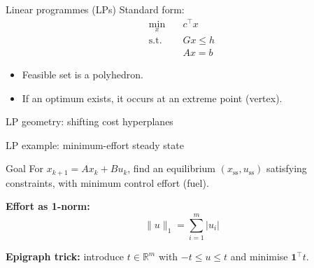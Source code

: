 \documentclass[aspectratio=169,10pt]{beamer}
\newcommand{\R}{\mathbb{R}}
\begin{document}
\begin{frame}{Linear programmes (LPs)}
Standard form:
\begin{equation*}
\begin{aligned}
\min_x\quad & c^\top x\\
\text{s.t.}\quad &Gx\le h\\
&Ax=b
\end{aligned}
\end{equation*}

\begin{itemize}
  \item Feasible set is a polyhedron.
  \item If an optimum exists, it occurs at an extreme point (vertex).
\end{itemize}
\end{frame}

\begin{frame}{LP geometry: shifting cost hyperplanes}
\begin{center}
\end{center}
\end{frame}

\begin{frame}{LP example: minimum-effort steady state}
\begin{examplebox}{Goal}
For $x_{k+1}=Ax_k+Bu_k$, find an equilibrium $(x_{\mathrm{ss}},u_{\mathrm{ss}})$ satisfying constraints,
with minimum control effort (fuel).
\end{examplebox}

\textbf{Effort as 1-norm:}
\begin{equation*}
\|u\|_1=\sum_{i=1}^m |u_i|
\end{equation*}

\textbf{Epigraph trick:} introduce $t\in\R^m$ with $-t\le u\le t$ and minimise $\mathbf{1}^\top t$.
\end{frame}
\end{document}
